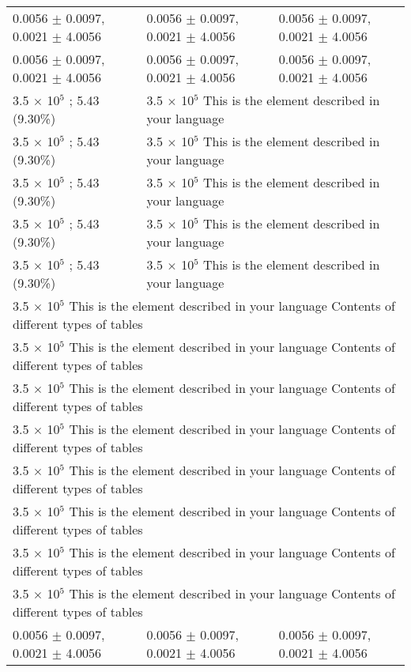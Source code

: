 \documentclass{libs/ccnu_format}
\begin{document}
\begin{frame}{}
\begin{minipage}{0.55\linewidth}
\begin{table}[H]
{\begin{tabular}{lll}
    0.0056 $\pm$ 0.0097, 0.0021 $\pm$ 4.0056& 0.0056 $\pm$ 0.0097, 0.0021 $\pm$ 4.0056 &  0.0056 $\pm$ 0.0097, 0.0021 $\pm$ 4.0056\\
    0.0056 $\pm$ 0.0097, 0.0021 $\pm$ 4.0056& 0.0056 $\pm$ 0.0097, 0.0021 $\pm$ 4.0056 &  0.0056 $\pm$ 0.0097, 0.0021 $\pm$ 4.0056\\
\midrule
3.5 $\times$ 10$^{5}$ ; 5.43 (9.30\%) & \multicolumn{2}{l}{3.5 $\times$ 10$^{5}$ This is the element described in your language}\\
3.5 $\times$ 10$^{5}$ ; 5.43 (9.30\%) &\multicolumn{2}{l}{3.5 $\times$ 10$^{5}$ This is the element described in your language} \\
3.5 $\times$ 10$^{5}$ ; 5.43 (9.30\%) & \multicolumn{2}{l}{3.5 $\times$ 10$^{5}$ This is the element described in your language} \\
3.5 $\times$ 10$^{5}$ ; 5.43 (9.30\%) & \multicolumn{2}{l}{3.5 $\times$ 10$^{5}$ This is the element described in your language}\\
3.5 $\times$ 10$^{5}$ ; 5.43 (9.30\%) & \multicolumn{2}{l}{3.5 $\times$ 10$^{5}$ This is the element described in your language}\\
\midrule
\multicolumn{3}{l}{3.5 $\times$ 10$^{5}$ This is the element described in your language Contents of different types of tables} \\
\multicolumn{3}{l}{3.5 $\times$ 10$^{5}$ This is the element described in your language Contents of different types of tables} \\
 \multicolumn{3}{l}{3.5 $\times$ 10$^{5}$ This is the element described in your language Contents of different types of tables} \\
 \multicolumn{3}{l}{3.5 $\times$ 10$^{5}$ This is the element described in your language Contents of different types of tables} \\
 \multicolumn{3}{l}{3.5 $\times$ 10$^{5}$ This is the element described in your language Contents of different types of tables} \\
 \multicolumn{3}{l}{3.5 $\times$ 10$^{5}$ This is the element described in your language Contents of different types of tables} \\
\multicolumn{3}{l}{3.5 $\times$ 10$^{5}$ This is the element described in your language Contents of different types of tables} \\
\multicolumn{3}{l}{3.5 $\times$ 10$^{5}$ This is the element described in your language Contents of different types of tables} \\
    \midrule
0.0056 $\pm$ 0.0097, 0.0021 $\pm$ 4.0056 & 0.0056 $\pm$ 0.0097, 0.0021 $\pm$ 4.0056 &  0.0056 $\pm$ 0.0097, 0.0021 $\pm$ 4.0056\\

\end{tabular}}
\end{table}
\end{minipage}
\end{frame}
\end{document}
